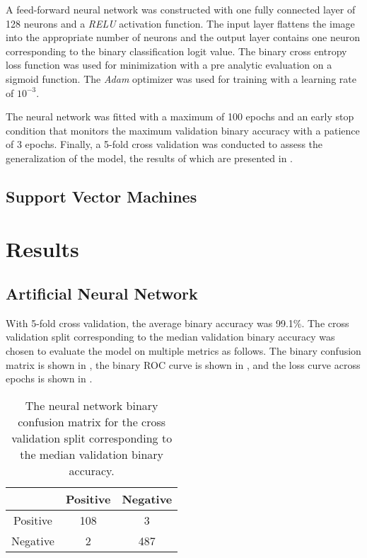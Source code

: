 \documentclass[twocolumn]{article}
\begin{document}
A feed-forward neural network was constructed with one fully connected layer of
128 neurons and a \emph{RELU} activation function. The input layer flattens the
image into the appropriate number of neurons and the output layer contains one
neuron corresponding to the binary classification logit value. The binary cross
entropy loss function was used for minimization with a pre analytic evaluation
on a sigmoid function. The \emph{Adam} optimizer was used for training with a
learning rate of $10^{-3}$.

The neural network was fitted with a maximum of 100 epochs and an early stop
condition that monitors the maximum validation binary accuracy with a patience
of 3 epochs. Finally, a 5-fold cross validation was conducted to assess the
generalization of the model, the results of which are presented in
.

\subsection{Support Vector Machines}

\section{Results}
\label{sec:Results}

\subsection{Artificial Neural Network}

With 5-fold cross validation, the average binary accuracy was 99.1\%. The
cross validation split corresponding to the median validation binary accuracy
was chosen to evaluate the model on multiple metrics as follows. The binary
confusion matrix is shown in , the binary
ROC curve is shown in , and the loss curve across
epochs is shown in .

\begin{table}
\begin{center}
\begin{tabular}{ccc}
\toprule
& Positive & Negative \\
\midrule
Positive & 108 & 3 \\
Negative & 2 & 487 \\
\bottomrule
\end{tabular}
\end{center}
\caption{The neural network binary confusion matrix for the cross validation
  split corresponding to the median validation binary accuracy.}
\label{tab:NeuralNetworkConfusionMatrix}
\end{table}
\end{document}
